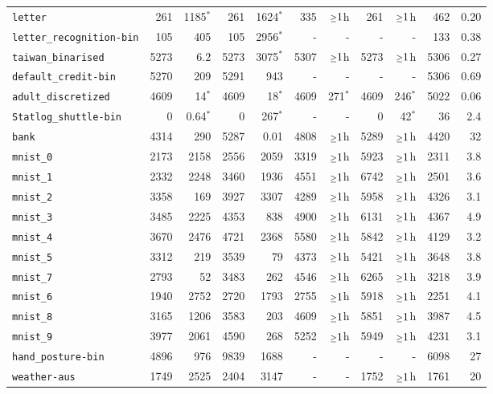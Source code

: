 \begin{tabular}{lrrrrrrrrrr}
\texttt{letter} & 261 & 1185$^*$ & 261 & 1624$^*$ & 335 & $\mathsmaller{\geq}1$h & 261 & $\mathsmaller{\geq}1$h & 462 & 0.20\\
\texttt{letter\_recognition-bin} & 105 & 405 & 105 & 2956$^*$ & - & - & - & - & 133 & 0.38\\
\texttt{taiwan\_binarised} & 5273 & 6.2 & 5273 & 3075$^*$ & 5307 & $\mathsmaller{\geq}1$h & 5273 & $\mathsmaller{\geq}1$h & 5306 & 0.27\\
\texttt{default\_credit-bin} & 5270 & 209 & 5291 & 943 & - & - & - & - & 5306 & 0.69\\
\texttt{adult\_discretized} & 4609 & 14$^*$ & 4609 & 18$^*$ & 4609 & 271$^*$ & 4609 & 246$^*$ & 5022 & 0.06\\
\texttt{Statlog\_shuttle-bin} & 0 & 0.64$^*$ & 0 & 267$^*$ & - & - & 0 & 42$^*$ & 36 & 2.4\\
\texttt{bank} & 4314 & 290 & 5287 & 0.01 & 4808 & $\mathsmaller{\geq}1$h & 5289 & $\mathsmaller{\geq}1$h & 4420 & 32\\
\texttt{mnist\_0} & 2173 & 2158 & 2556 & 2059 & 3319 & $\mathsmaller{\geq}1$h & 5923 & $\mathsmaller{\geq}1$h & 2311 & 3.8\\
\texttt{mnist\_1} & 2332 & 2248 & 3460 & 1936 & 4551 & $\mathsmaller{\geq}1$h & 6742 & $\mathsmaller{\geq}1$h & 2501 & 3.6\\
\texttt{mnist\_2} & 3358 & 169 & 3927 & 3307 & 4289 & $\mathsmaller{\geq}1$h & 5958 & $\mathsmaller{\geq}1$h & 4326 & 3.1\\
\texttt{mnist\_3} & 3485 & 2225 & 4353 & 838 & 4900 & $\mathsmaller{\geq}1$h & 6131 & $\mathsmaller{\geq}1$h & 4367 & 4.9\\
\texttt{mnist\_4} & 3670 & 2476 & 4721 & 2368 & 5580 & $\mathsmaller{\geq}1$h & 5842 & $\mathsmaller{\geq}1$h & 4129 & 3.2\\
\texttt{mnist\_5} & 3312 & 219 & 3539 & 79 & 4373 & $\mathsmaller{\geq}1$h & 5421 & $\mathsmaller{\geq}1$h & 3648 & 3.8\\
\texttt{mnist\_7} & 2793 & 52 & 3483 & 262 & 4546 & $\mathsmaller{\geq}1$h & 6265 & $\mathsmaller{\geq}1$h & 3218 & 3.9\\
\texttt{mnist\_6} & 1940 & 2752 & 2720 & 1793 & 2755 & $\mathsmaller{\geq}1$h & 5918 & $\mathsmaller{\geq}1$h & 2251 & 4.1\\
\texttt{mnist\_8} & 3165 & 1206 & 3583 & 203 & 4609 & $\mathsmaller{\geq}1$h & 5851 & $\mathsmaller{\geq}1$h & 3987 & 4.5\\
\texttt{mnist\_9} & 3977 & 2061 & 4590 & 268 & 5252 & $\mathsmaller{\geq}1$h & 5949 & $\mathsmaller{\geq}1$h & 4231 & 3.1\\
\texttt{hand\_posture-bin} & 4896 & 976 & 9839 & 1688 & - & - & - & - & 6098 & 27\\
\texttt{weather-aus} & 1749 & 2525 & 2404 & 3147 & - & - & 1752 & $\mathsmaller{\geq}1$h & 1761 & 20\\
\bottomrule
\end{tabular}
